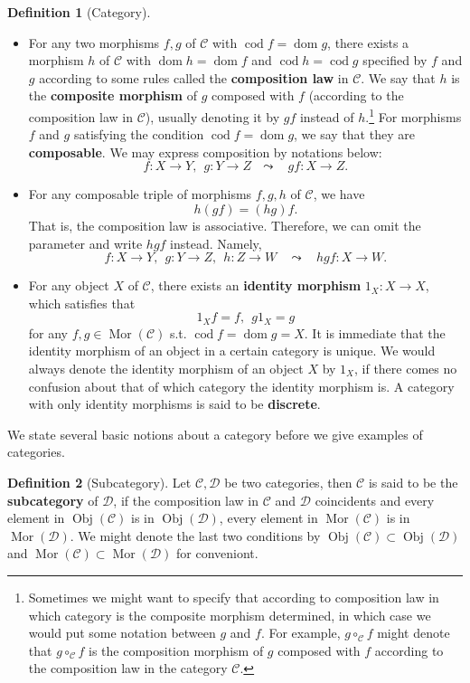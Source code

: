 \documentclass{article}
\theoremstyle{definition}
\newtheorem{definition}{Definition}[section]
\theoremstyle{definition}
\theoremstyle{remark}
\DeclareMathOperator{\Obj}{Obj}
\DeclareMathOperator{\Mor}{Mor}
\DeclareMathOperator{\dom}{dom}
\DeclareMathOperator{\cod}{cod}
\begin{document}
\begin{definition}[Category]
\begin{itemize}
			\item For any two morphisms $f,g$ of $\mathcal{C}$ with $\cod f=\dom g$, there exists a morphism $h$ of $\mathcal{C}$ with $\dom h=\dom f$ and $\cod h=\cod g$ specified by $f$ and $g$ according to some rules called the \textbf{composition law} in $\mathcal{C}$. We say that $h$ is the \textbf{composite morphism} of $g$ composed with $f$ (according to the composition law in $\mathcal{C}$), usually denoting it by $gf$ instead of $h$.\footnote{Sometimes we might want to specify that according to composition law in which category is the composite morphism determined, in which case we would put some notation between $g$ and $f$. For example, $g\circ_\mathcal{C} f$ might denote that $g\circ_\mathcal{C} f$ is the composition morphism of $g$ composed with $f$ according to the composition law in the category $\mathcal{C}$.} For morphisms $f$ and $g$ satisfying the condition $\cod f=\dom g$, we say that they are \textbf{composable}. We may express composition by notations below:
				\[f:X\to Y,\ \ g:Y\to Z\ \ \ \leadsto\ \ \ \ gf:X\to Z.\]
			\item For any composable triple of morphisms $f,g,h$ of $\mathcal{C}$, we have
				\[h(gf)=(hg)f.\]
			That is, the composition law is associative. Therefore, we can omit the parameter and write $hgf$ instead. Namely,
				\[f:X\to Y,\ \ g:Y\to Z,\ \ h:Z\to W\ \ \ \ \leadsto\ \ \ \ hgf:X\to W.\]
			\item For any object $X$ of $\mathcal{C}$, there exists an \textbf{identity morphism} $1_X:X\to X$, which satisfies that
			\[1_Xf=f,\ \ g1_X=g\]
			for any $f,g\in \Mor(\mathcal{C})$ s.t. $\cod f=\dom g=X$. It is immediate that the identity morphism of an object in a certain category is unique. We would always denote the identity morphism of an object $X$ by $1_X$, if there comes no confusion about that of which category the identity morphism is. A category with only identity morphisms is said to be \textbf{discrete}.
		\end{itemize}
	\end{definition}
We state several basic notions about a category before we give examples of categories.
	\begin{definition}[Subcategory]
	Let $\mathcal{C},\mathcal{D}$ be two categories, then $\mathcal{C}$ is said to be the \textbf{subcategory} of $\mathcal{D}$, if the composition law in $\mathcal{C}$ and $\mathcal{D}$ coincidents and every element in $\Obj(\mathcal{C})$ is in $\Obj(\mathcal{D})$, every element in $\Mor(\mathcal{C})$ is in $\Mor(\mathcal{D})$. We might denote the last two conditions by $\Obj(\mathcal{C})\subset\Obj(\mathcal{D})$ and $\Mor(\mathcal{C})\subset\Mor(\mathcal{D})$ for conveniont.
	\end{definition}
\end{document}
